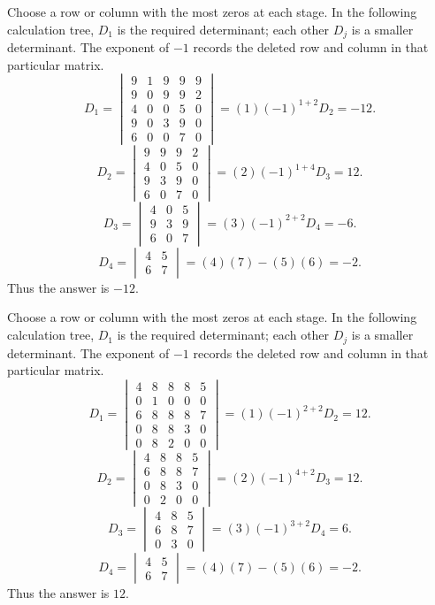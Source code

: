 Choose a row or column with the most zeros at each stage. In the following calculation tree, $D_{1}$ is the required determinant; each other $D_j$ is a smaller determinant. The exponent of $-1$ records the deleted row and column in that particular matrix.
\[
D_{1}=\begin{vmatrix}9&1&9&9&9\\9&0&9&9&2\\4&0&0&5&0\\9&0&3&9&0\\6&0&0&7&0\end{vmatrix}=(1)(-1)^{1+2}D_{2}=-12.
\]
\[
D_{2}=\begin{vmatrix}9&9&9&2\\4&0&5&0\\9&3&9&0\\6&0&7&0\end{vmatrix}=(2)(-1)^{1+4}D_{3}=12.
\]
\[
D_{3}=\begin{vmatrix}4&0&5\\9&3&9\\6&0&7\end{vmatrix}=(3)(-1)^{2+2}D_{4}=-6.
\]
\[
D_{4}=\begin{vmatrix}4&5\\6&7\end{vmatrix}=(4)(7)-(5)(6)=-2.
\]
Thus the answer is $-12$.

Choose a row or column with the most zeros at each stage. In the following calculation tree, $D_{1}$ is the required determinant; each other $D_j$ is a smaller determinant. The exponent of $-1$ records the deleted row and column in that particular matrix.
\[
D_{1}=\begin{vmatrix}4&8&8&8&5\\0&1&0&0&0\\6&8&8&8&7\\0&8&8&3&0\\0&8&2&0&0\end{vmatrix}=(1)(-1)^{2+2}D_{2}=12.
\]
\[
D_{2}=\begin{vmatrix}4&8&8&5\\6&8&8&7\\0&8&3&0\\0&2&0&0\end{vmatrix}=(2)(-1)^{4+2}D_{3}=12.
\]
\[
D_{3}=\begin{vmatrix}4&8&5\\6&8&7\\0&3&0\end{vmatrix}=(3)(-1)^{3+2}D_{4}=6.
\]
\[
D_{4}=\begin{vmatrix}4&5\\6&7\end{vmatrix}=(4)(7)-(5)(6)=-2.
\]
Thus the answer is $12$.

